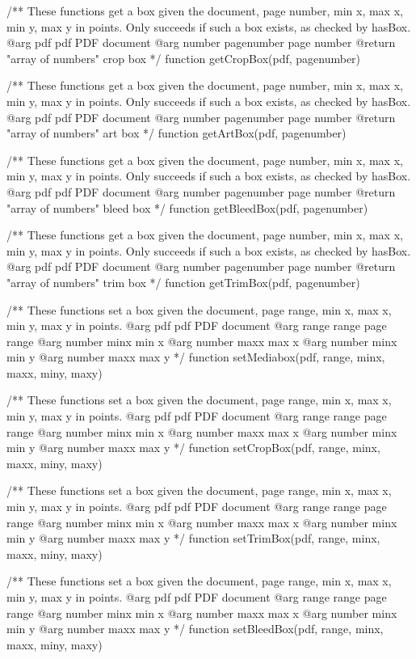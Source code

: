 /** These functions get a box given the document, page number, min x, max x,
min y, max y in points. Only succeeds if such a box exists, as checked by
hasBox.
@arg {pdf} pdf PDF document
@arg {number} pagenumber page number
@return {"array of numbers"} crop box */
function getCropBox(pdf, pagenumber) {}

/** These functions get a box given the document, page number, min x, max x,
min y, max y in points. Only succeeds if such a box exists, as checked by
hasBox.
@arg {pdf} pdf PDF document
@arg {number} pagenumber page number
@return {"array of numbers"} art box */
function getArtBox(pdf, pagenumber) {}

/** These functions get a box given the document, page number, min x, max x,
min y, max y in points. Only succeeds if such a box exists, as checked by
hasBox.
@arg {pdf} pdf PDF document
@arg {number} pagenumber page number
@return {"array of numbers"} bleed box */
function getBleedBox(pdf, pagenumber) {}

/** These functions get a box given the document, page number, min x, max x,
min y, max y in points. Only succeeds if such a box exists, as checked by
hasBox.
@arg {pdf} pdf PDF document
@arg {number} pagenumber page number
@return {"array of numbers"} trim box */
function getTrimBox(pdf, pagenumber) {}

/** These functions set a box given the document, page range, min x, max x,
min y, max y in points.
@arg {pdf} pdf PDF document
@arg {range} range page range
@arg {number} minx min x
@arg {number} maxx max x
@arg {number} minx min y
@arg {number} maxx max y */
function setMediabox(pdf, range, minx, maxx, miny, maxy) {}

/** These functions set a box given the document, page range, min x, max x,
min y, max y in points.
@arg {pdf} pdf PDF document
@arg {range} range page range
@arg {number} minx min x
@arg {number} maxx max x
@arg {number} minx min y
@arg {number} maxx max y */
function setCropBox(pdf, range, minx, maxx, miny, maxy) {}

/** These functions set a box given the document, page range, min x, max x,
min y, max y in points.
@arg {pdf} pdf PDF document
@arg {range} range page range
@arg {number} minx min x
@arg {number} maxx max x
@arg {number} minx min y
@arg {number} maxx max y */
function setTrimBox(pdf, range, minx, maxx, miny, maxy) {}

/** These functions set a box given the document, page range, min x, max x,
min y, max y in points.
@arg {pdf} pdf PDF document
@arg {range} range page range
@arg {number} minx min x
@arg {number} maxx max x
@arg {number} minx min y
@arg {number} maxx max y */
function setBleedBox(pdf, range, minx, maxx, miny, maxy) {}


